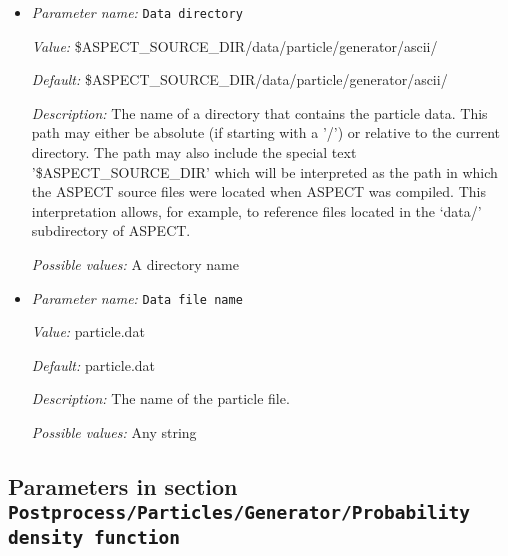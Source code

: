 \begin{itemize}
\item {\it Parameter name:} {\tt Data directory}
\label{parameters:Postprocess/Particles/Generator/Ascii file/Data directory}


{\it Value:} \$ASPECT\_SOURCE\_DIR/data/particle/generator/ascii/


{\it Default:} \$ASPECT\_SOURCE\_DIR/data/particle/generator/ascii/


{\it Description:} The name of a directory that contains the particle data. This path may either be absolute (if starting with a '/') or relative to the current directory. The path may also include the special text '\$ASPECT\_SOURCE\_DIR' which will be interpreted as the path in which the ASPECT source files were located when ASPECT was compiled. This interpretation allows, for example, to reference files located in the `data/' subdirectory of ASPECT. 


{\it Possible values:} A directory name
\item {\it Parameter name:} {\tt Data file name}
\label{parameters:Postprocess/Particles/Generator/Ascii file/Data file name}


{\it Value:} particle.dat


{\it Default:} particle.dat


{\it Description:} The name of the particle file.


{\it Possible values:} Any string
\end{itemize}

\subsection{Parameters in section \tt Postprocess/Particles/Generator/Probability density function}
\label{parameters:Postprocess/Particles/Generator/Probability_20density_20function}

